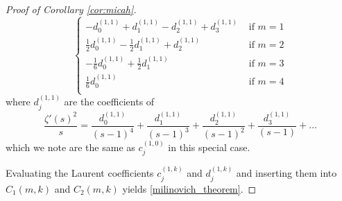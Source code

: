 \documentclass[10pt,a4paper]{amsart}
\begin{document}
\begin{proof}[Proof of Corollary \ref{cor:micah}]
\[\begin{cases}
-d^{(1,1)}_0 +d^{(1,1)}_1 -d^{(1,1)}_2 +d^{(1,1)}_3  & \text{ if } m=1 \\[1.5ex]
\frac{1}{2} d^{(1,1)}_0 -\frac{1}{2} d^{(1,1)}_1 +d^{(1,1)}_2 & \text{ if } m=2 \\[1.5ex]
 -\frac{1}{6} d^{(1,1)}_0 +\frac{1}{2} d^{(1,1)}_1 & \text{ if } m=3 \\[1.5ex]
\frac{1}{6} d^{(1,1)}_0 & \text{ if } m=4 \\[1.5ex]
\end{cases}
\]
where $d^{(1,1)}_j$ are the coefficients of
\[
\frac{\zeta'(s)^2}{s} = \frac{d^{(1,1)}_0}{(s-1)^4} + \frac{d^{(1,1)}_1}{(s-1)^3} + \frac{d^{(1,1)}_2}{(s-1)^2} + \frac{d^{(1,1)}_3}{(s-1)} + \dots
\]
which we note are the same as $c^{(1,0)}_j$ in this special case.

Evaluating the Laurent coefficients $c^{(1,k)}_j$ and $d^{(1,k)}_j$ and inserting them into $C_1(m,k)$ and $C_2(m,k)$ yields \eqref{milinovich_theorem}.
\end{proof}
\end{document}
